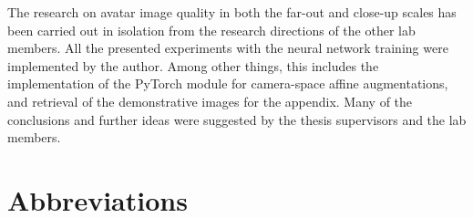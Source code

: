 The research on avatar image quality in both the far-out and close-up scales has been carried out in isolation from the research directions of the other lab members. All the presented experiments with the neural network training were implemented by the author. Among other things, this includes the implementation of the PyTorch module for camera-space affine augmentations, and retrieval of the demonstrative images for the appendix. Many of the conclusions and further ideas were suggested by the thesis supervisors and the lab members.
 
\newpage
\section*{\centering Abbreviations}

